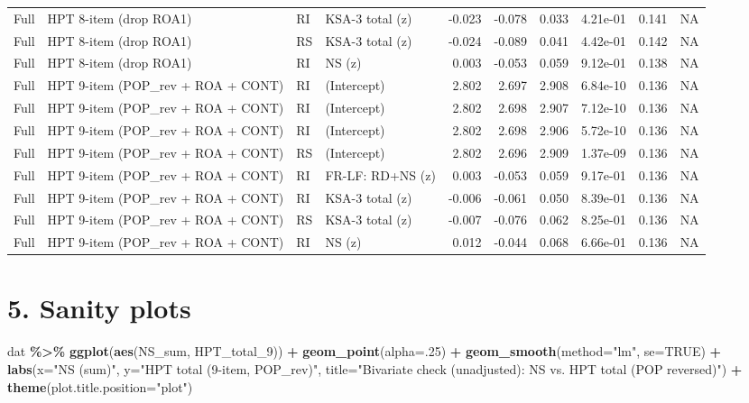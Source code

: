 \documentclass[
  10pt,
]{article}
\newenvironment{Shaded}{\begin{snugshade}}{\end{snugshade}}
\newcommand{\AttributeTok}[1]{\textcolor[rgb]{0.13,0.29,0.53}{#1}}
\newcommand{\ConstantTok}[1]{\textcolor[rgb]{0.56,0.35,0.01}{#1}}
\newcommand{\DecValTok}[1]{\textcolor[rgb]{0.00,0.00,0.81}{#1}}
\newcommand{\FunctionTok}[1]{\textcolor[rgb]{0.13,0.29,0.53}{\textbf{#1}}}
\newcommand{\NormalTok}[1]{#1}
\newcommand{\SpecialCharTok}[1]{\textcolor[rgb]{0.81,0.36,0.00}{\textbf{#1}}}
\newcommand{\StringTok}[1]{\textcolor[rgb]{0.31,0.60,0.02}{#1}}
\begin{document}
\begin{table}[t]
\begin{tabular*}{\linewidth}{@{\extracolsep{\fill}}llllrrrrrr}
Full & HPT 8-item (drop ROA1) & RI & KSA-3 total (z) & -0.023 & -0.078 & 0.033 & 4.21e-01 & 0.141 & NA \\
Full & HPT 8-item (drop ROA1) & RS & KSA-3 total (z) & -0.024 & -0.089 & 0.041 & 4.42e-01 & 0.142 & NA \\
Full & HPT 8-item (drop ROA1) & RI & NS (z) & 0.003 & -0.053 & 0.059 & 9.12e-01 & 0.138 & NA \\
Full & HPT 9-item (POP\_rev + ROA + CONT) & RI & (Intercept) & 2.802 & 2.697 & 2.908 & 6.84e-10 & 0.136 & NA \\
Full & HPT 9-item (POP\_rev + ROA + CONT) & RI & (Intercept) & 2.802 & 2.698 & 2.907 & 7.12e-10 & 0.136 & NA \\
Full & HPT 9-item (POP\_rev + ROA + CONT) & RI & (Intercept) & 2.802 & 2.698 & 2.906 & 5.72e-10 & 0.136 & NA \\
Full & HPT 9-item (POP\_rev + ROA + CONT) & RS & (Intercept) & 2.802 & 2.696 & 2.909 & 1.37e-09 & 0.136 & NA \\
Full & HPT 9-item (POP\_rev + ROA + CONT) & RI & FR-LF: RD+NS (z) & 0.003 & -0.053 & 0.059 & 9.17e-01 & 0.136 & NA \\
Full & HPT 9-item (POP\_rev + ROA + CONT) & RI & KSA-3 total (z) & -0.006 & -0.061 & 0.050 & 8.39e-01 & 0.136 & NA \\
Full & HPT 9-item (POP\_rev + ROA + CONT) & RS & KSA-3 total (z) & -0.007 & -0.076 & 0.062 & 8.25e-01 & 0.136 & NA \\
Full & HPT 9-item (POP\_rev + ROA + CONT) & RI & NS (z) & 0.012 & -0.044 & 0.068 & 6.66e-01 & 0.136 & NA \\
\bottomrule
\end{tabular*}
\end{table}

\hypertarget{sanity-plots}{%
\section{5. Sanity plots}\label{sanity-plots}}

\begin{Shaded}
\begin{Highlighting}[]
\NormalTok{dat }\SpecialCharTok{\%\textgreater{}\%}
  \FunctionTok{ggplot}\NormalTok{(}\FunctionTok{aes}\NormalTok{(NS\_sum, HPT\_total\_9)) }\SpecialCharTok{+}
  \FunctionTok{geom\_point}\NormalTok{(}\AttributeTok{alpha=}\NormalTok{.}\DecValTok{25}\NormalTok{) }\SpecialCharTok{+} \FunctionTok{geom\_smooth}\NormalTok{(}\AttributeTok{method=}\StringTok{"lm"}\NormalTok{, }\AttributeTok{se=}\ConstantTok{TRUE}\NormalTok{) }\SpecialCharTok{+}
  \FunctionTok{labs}\NormalTok{(}\AttributeTok{x=}\StringTok{"NS (sum)"}\NormalTok{, }\AttributeTok{y=}\StringTok{"HPT total (9{-}item, POP\_rev)"}\NormalTok{,}
       \AttributeTok{title=}\StringTok{"Bivariate check (unadjusted): NS vs. HPT total (POP reversed)"}\NormalTok{) }\SpecialCharTok{+}
  \FunctionTok{theme}\NormalTok{(}\AttributeTok{plot.title.position=}\StringTok{"plot"}\NormalTok{)}
\end{Highlighting}
\end{Shaded}
\end{document}
